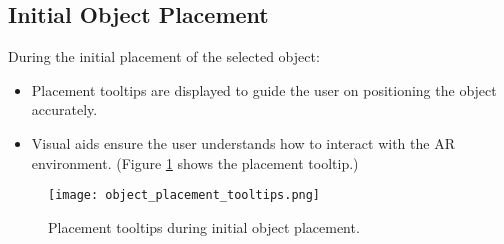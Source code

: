 \subsection{Initial Object Placement}
During the initial placement of the selected object:
\begin{itemize}
    \item Placement tooltips are displayed to guide the user on positioning the object accurately.
    \item Visual aids ensure the user understands how to interact with the AR environment. (Figure \ref{fig:ui_initial_placement} shows the placement tooltip.)
\end{itemize}
\begin{figure}[h!]
    \centering
    \texttt{[image: object\_placement\_tooltips.png]} %
    \caption{Placement tooltips during initial object placement.}
    \label{fig:ui_initial_placement}
\end{figure}


